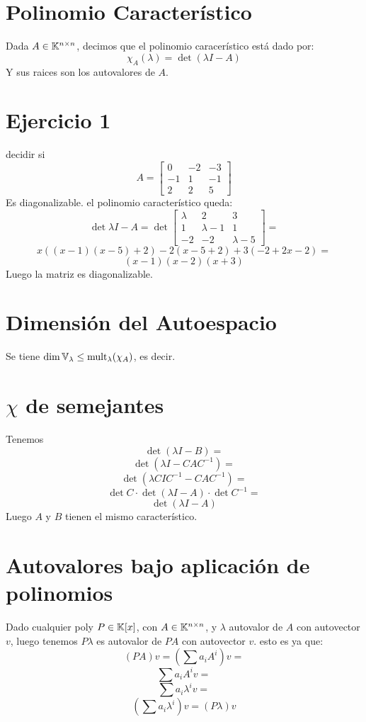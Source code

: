 \documentclass{article}
\begin{document}
\section*{Polinomio Característico}
Dada $A \in \mathbb{K}^{n \times n}$, decimos que el polinomio caracerístico está dado por:
\[
    \chi_A(\lambda) = \det (\lambda I - A)
\]
Y sus raices son los autovalores de $A$.

\section*{Ejercicio 1}
decidir si
\[
    A = 
    \begin{bmatrix}
        0 & -2 & -3 \\
        -1 & 1 & -1 \\
        2 & 2 & 5
    \end{bmatrix}
\]
Es diagonalizable. el polinomio característico queda:
\[
    \det \lambda I - A = 
    \det \begin{bmatrix}
        \lambda & 2 & 3 \\
        1 & \lambda - 1 & 1 \\
        -2 & - 2 & \lambda -5
    \end{bmatrix} =\]\[
x((x-1)(x-5) + 2) - 2(x - 5+ 2) + 3(-2 + 2x - 2) =\]\[
(x-1)(x-2)(x+3)
\]
Luego la matriz es diagonalizable.

\section*{Dimensión del Autoespacio}
Se tiene $\dim \mathbb{V}_\lambda \leq \operatorname{mult}_\lambda(\chi_A)$, es decir.

\section*{$\chi$ de semejantes}
Tenemos
\[\det (\lambda I - B) = \]
\[\det (\lambda I - CAC^{-1}) = \]
\[\det (\lambda CIC^{-1} - CAC^{-1}) = \]
\[\det C \cdot \det (\lambda I - A) \cdot \det C^{-1} = \]
\[\det (\lambda I - A)\]
Luego $A$ y $B$ tienen el mismo característico.

\section*{Autovalores bajo aplicación de polinomios}
Dado cualquier poly $P \in \mathbb{K}[x]$, con $A \in \mathbb{K}^{n \times n}$, y $\lambda$ autovalor de $A$ con autovector $v$, luego tenemos $P \lambda$ es autovalor de $PA$ con autovector $v$. esto es ya que:
\[
    (PA)v = \left(\sum a_iA^i\right) v =
\]
\[
    \sum a_iA^iv =
\]
\[
    \sum a_i\lambda^iv =
\]
\[
    \left(\sum a_i\lambda^i\right)v = (P\lambda)v
\]
\end{document}

